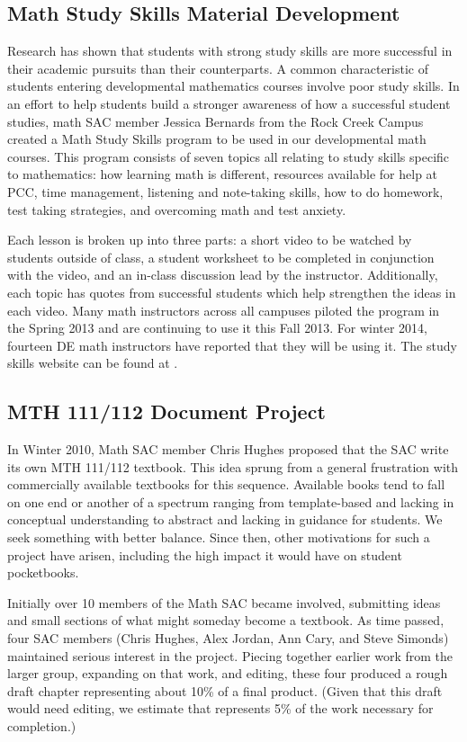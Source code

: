 \subsection{Math Study Skills Material Development}\label{cur:sub:studyskills}
Research has shown that students with strong study skills are more successful in
their academic pursuits than their counterparts.  A common characteristic of
students entering developmental mathematics courses involve poor study skills.
In an effort to help students build a stronger awareness of how a successful
student studies, math SAC member Jessica Bernards from the Rock Creek Campus
created a Math Study Skills program to be used in our developmental math
courses.  This program consists of seven topics all relating to study skills
specific to mathematics: how learning math is different, resources available for
help at PCC, time management, listening and note-taking skills, how to do
homework, test taking strategies, and overcoming math and test anxiety.  

Each lesson is broken up into three parts: a short video to be watched by students
outside of class, a student worksheet to be completed in conjunction with the
video, and an in-class discussion lead by the instructor. Additionally, each
topic has quotes from successful students which help strengthen the ideas in
each video.  Many math instructors across all campuses piloted the program in
the Spring 2013 and are continuing to use it this Fall 2013. For winter 2014,
fourteen DE math instructors have reported that they will be using it. The study
skills website can be found at \cite{studyskills}.
 
\subsection{MTH 111/112 Document Project}\label{cur:sec:111/112doc}
In Winter 2010, Math SAC member Chris Hughes proposed that the SAC write its own
MTH 111/112 textbook. This idea sprung from a general frustration with
commercially available textbooks for this sequence.  Available books tend to
fall on one end or another of a spectrum ranging from template-based and lacking
in conceptual understanding to abstract and lacking in guidance for students.
We seek something with better balance.  Since then, other motivations for such a
project have arisen, including the high impact it would have on student
pocketbooks.

Initially over 10 members of the Math SAC became involved, submitting ideas and
small sections of what might someday become a textbook.  As time passed, four
SAC members (Chris Hughes, Alex Jordan, Ann Cary, and Steve Simonds) maintained
serious interest in the project.  Piecing together earlier work from the larger
group, expanding on that work, and editing, these four produced a rough draft
chapter representing about 10\% of a final product. (Given that this draft would
need editing, we estimate that represents 5\% of the work necessary for
completion.)

